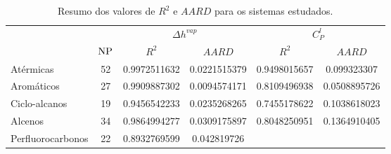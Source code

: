 \begin{table}[h]
\renewcommand{\arraystretch}{1.3}
\caption{Resumo dos valores de $R^2$ e $AARD$ para os sistemas estudados.}
\footnotesize
\center
\begin{tabular}{lS[table-format=2.0,round-mode=places,round-precision=0]SSSS}
\toprule
 &  &  & \\
 \cmidrule(lr{.5em}){3-4} \cmidrule(lr{.5em}){5-6}
& {$\rm{NP}$} & {$R^2$}& {$AARD$} & {$R^2$}& {$AARD$}\\
\midrule 
Atérmicas & 52 & 0.9972511632 & 0.0221515379 & 0.9498015657 & 0.099323307 \\
Aromáticos & 27 & 0.9909887302 & 0.0094574171 & 0.8109496938 & 0.0508895726 \\
Ciclo-alcanos & 19 & 0.9456542233 & 0.0235268265 & 0.7455178622 & 0.1038618023 \\
Alcenos & 34 & 0.9864994277 & 0.0309175897 & 0.8048250951 & 0.1364910405 \\
Perfluorocarbonos & 22 & 0.8932769599 & 0.042819726\\
\bottomrule
\end{tabular}
\label{tab:Hvap_overallDev}
\end{table}


